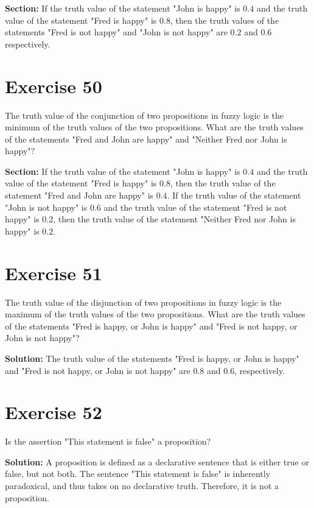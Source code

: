 \documentclass{Axon}
\begin{document}
\noindent
\textbf{Section:}
If the truth value of the statement "John is happy" is \(0.4\) and the truth value of the statement "Fred is happy" is \(0.8\), then the truth values of the statements "Fred is not happy" and "John is not happy" are \(0.2\) and \(0.6\) respectively. 

\section*{Exercise 50}
The truth value of the conjunction of two propositions in fuzzy logic is the minimum of the truth values of the two propositions. What are the truth values of the statements "Fred and John are happy" and "Neither Fred nor John is happy"?

\noindent
\textbf{Section:}
If the truth value of the statement "John is happy" is \(0.4\) and the truth value of the statement "Fred is happy" is \(0.8\), then the truth value of the statement "Fred and John are happy" is \(0.4\). If the truth value of the statement "John is not happy" is \(0.6\) and the truth value of the statement "Fred is not happy" is \(0.2\), then the truth value of the statement "Neither Fred nor John is happy" is \(0.2\).

\section*{Exercise 51}
The truth value of the disjunction of two propositions in fuzzy logic is the maximum of the truth values of the two propositions. What are the truth values of the statements "Fred is happy, or John is happy" and "Fred is not happy, or John is not happy"?

\noindent
\textbf{Solution:}
The truth value of the statements "Fred is happy, or John is happy" and "Fred is not happy, or John is not happy" are \(0.8\) and \(0.6\), respectively.

\section*{Exercise 52}
Is the assertion "This statement is false" a proposition?

\noindent
\textbf{Solution:}
A proposition is defined as a declarative sentence that is either true or false, but not both. The sentence "This statement is false" is inherently paradoxical, and thus takes on no declarative truth. Therefore, it is not a proposition.
\end{document}

